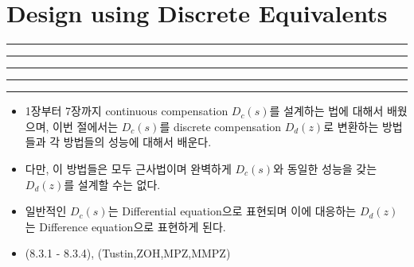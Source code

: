 \setcounter{chapter}{7}
\setcounter{section}{2}
\section{Design using Discrete Equivalents}
\vspace{-8pt} \hrule \hrule \hrule \hrule \hrule  \vspace{12pt}
\begin{itemize}
	\item 1장부터 7장까지 continuous compensation $D_c(s)$를 설계하는 법에 대해서 배웠으며, 이번 절에서는 $D_c(s)$를 discrete compensation $D_d(z)$로 변환하는 방법들과 각 방법들의 성능에 대해서 배운다.
	\item 다만, 이 방법들은 모두 근사법이며 완벽하게 $D_c(s)$와 동일한 성능을 갖는 $D_d(z)$를 설계할 수는 없다.
	\item 일반적인 $D_c(s)$는 Differential equation으로 표현되며 이에 대응하는 $D_d(z)$는 Difference equation으로 표현하게 된다.
	\item (8.3.1 - 8.3.4), (Tustin,ZOH,MPZ,MMPZ)

	
	
	
\end{itemize}
